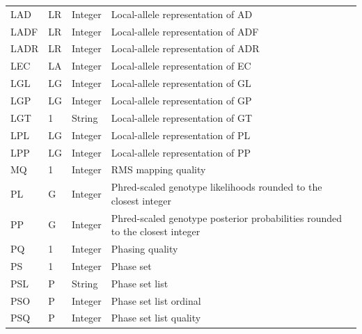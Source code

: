\documentclass[8pt]{article}
\begin{document}
\begin{longtable}[c]{ | p{2.5cm} | p{1.5cm} | p{1.5cm} | p{10.3cm} | }
      LAD		& LR    	& Integer	& Local-allele representation of AD \\
      LADF		& LR    	& Integer	& Local-allele representation of ADF \\
      LADR		& LR    	& Integer	& Local-allele representation of ADR \\
      LEC		& LA     	& Integer	& Local-allele representation of EC \\
      LGL		& LG    	& Integer	& Local-allele representation of GL \\
      LGP		& LG    	& Integer	& Local-allele representation of GP \\
      LGT		& 1			& String 	& Local-allele representation of GT \\
      LPL		& LG    	& Integer	& Local-allele representation of PL \\
      LPP		& LG    	& Integer	& Local-allele representation of PP \\
      MQ		& 1			& Integer	& RMS mapping quality \\
      PL		& G			& Integer	& Phred-scaled genotype likelihoods rounded to the closest integer \\
      PP		& G			& Integer	& Phred-scaled genotype posterior probabilities rounded to the closest integer \\
      PQ		& 1			& Integer	& Phasing quality \\
      PS		& 1			& Integer	& Phase set \\
      PSL		& P			& String	& Phase set list \\
      PSO		& P			& Integer	& Phase set list ordinal \\
      PSQ		& P			& Integer	& Phase set list quality \\

\end{longtable}
\end{document}
